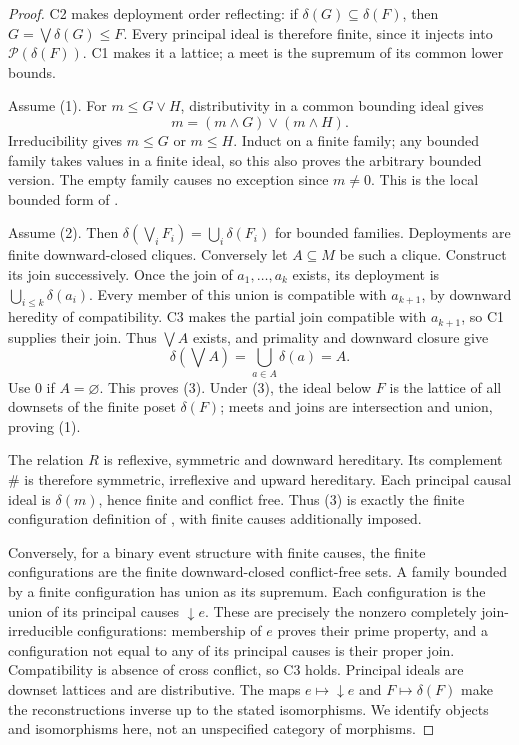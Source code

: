 \begin{proof}
C2 makes deployment order reflecting: if
\(\delta(G)\subseteq\delta(F)\), then
\(G=\bigvee\delta(G)\leq F\). Every principal ideal is therefore
finite, since it injects into \(\mathcal P(\delta(F))\).
C1 makes it a lattice; a meet is the supremum of its common
lower bounds.

Assume (1). For \(m\leq G\vee H\), distributivity in a common
bounding ideal gives
\[
 m=(m\wedge G)\vee(m\wedge H).
\]
Irreducibility gives \(m\leq G\) or \(m\leq H\). Induct on a
finite family; any bounded family takes values in a finite
ideal, so this also proves the arbitrary bounded version.
The empty family causes no exception since \(m\ne0\).
This is the local bounded form of
\citet[Chapter IX, \S4, Lemma 1 and Theorem 5, p.~139]{Birkhoff1948}.

Assume (2). Then
\(\delta(\bigvee_iF_i)=\bigcup_i\delta(F_i)\) for bounded
families. Deployments are finite downward-closed cliques.
Conversely let \(A\subseteq M\) be such a clique. Construct
its join successively. Once the join of \(a_1,\ldots,a_k\)
exists, its deployment is
\(\bigcup_{i\leq k}\delta(a_i)\). Every member of this union
is compatible with \(a_{k+1}\), by downward heredity of
compatibility. C3 makes the partial join compatible with
\(a_{k+1}\), so C1 supplies their join. Thus \(\bigvee A\)
exists, and primality and downward closure give
\[
 \delta(\bigvee A)=\bigcup_{a\in A}\delta(a)=A.
\]
Use \(0\) if \(A=\varnothing\). This proves (3).
Under (3), the ideal below \(F\) is the lattice of all downsets
of the finite poset \(\delta(F)\); meets and joins are
intersection and union, proving (1).

The relation \(R\) is reflexive, symmetric and downward
hereditary. Its complement \(\#\) is therefore symmetric,
irreflexive and upward hereditary. Each principal causal
ideal is \(\delta(m)\), hence finite and conflict free.
Thus (3) is exactly the finite configuration definition
of \citet[Definition 14, pp.~99--100]{NPW1981}, with finite
causes additionally imposed.

Conversely, for a binary event structure with finite causes,
the finite configurations are the finite downward-closed
conflict-free sets. A family bounded by a finite configuration
has union as its supremum. Each configuration is the union
of its principal causes \(\downarrow e\). These are precisely
the nonzero completely join-irreducible configurations:
membership of \(e\) proves their prime property, and
a configuration not equal to any of its principal causes
is their proper join. Compatibility is absence of cross
conflict, so C3 holds. Principal ideals are downset lattices
and are distributive. The maps \(e\mapsto\downarrow e\)
and \(F\mapsto\delta(F)\) make the reconstructions inverse
up to the stated isomorphisms. We identify objects and
isomorphisms here, not an unspecified category of morphisms.


\end{proof}
